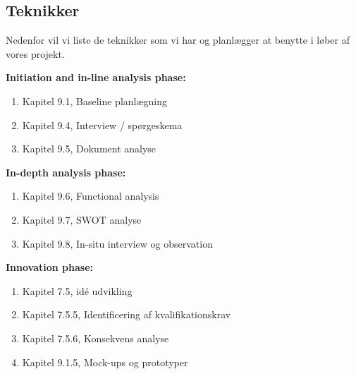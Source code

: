 \subsection{Teknikker}
Nedenfor vil vi liste de teknikker som vi har og planlægger at benytte i løber af vores projekt.\\ 

\textbf{Initiation and in-line analysis phase:}
\begin{enumerate}
	\item Kapitel 9.1, Baseline planlægning
	\item Kapitel 9.4, Interview / spørgeskema
	\item Kapitel 9.5, Dokument analyse
\end{enumerate}
\textbf{In-depth analysis phase:}
\begin{enumerate}
	\item Kapitel 9.6, Functional analysis
	\item Kapitel 9.7, SWOT analyse
	\item Kapitel 9.8, In-situ interview og observation
\end{enumerate}
\textbf{Innovation phase:}
\begin{enumerate}
	\item Kapitel 7.5, idé udvikling
	\item Kapitel 7.5.5, Identificering af kvalifikationskrav
	\item Kapitel 7.5.6, Konsekvens analyse
	\item Kapitel 9.1.5, Mock-ups og prototyper
\end{enumerate}